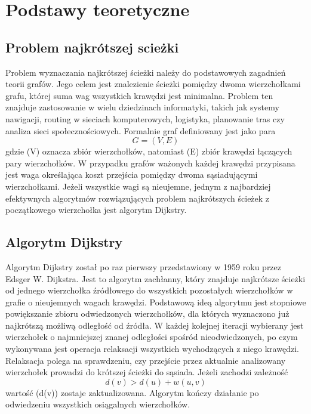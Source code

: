 \chapter{Podstawy teoretyczne}
\section{Problem najkrótszej scieżki}
\indent Problem wyznaczania najkrótszej ścieżki należy do podstawowych zagadnień teorii grafów. Jego celem jest znalezienie ścieżki pomiędzy dwoma wierzchołkami grafu, której suma wag wszystkich krawędzi jest minimalna. Problem ten znajduje zastosowanie w wielu dziedzinach informatyki, takich jak systemy nawigacji, routing w sieciach komputerowych, logistyka, planowanie tras czy analiza sieci społecznościowych.
\newline
Formalnie graf definiowany jest jako para \cite[s.~2]{diestel2017}
\begin{equation}
\label{eq:graph}
G = (V, E)
\end{equation}
gdzie (V) oznacza zbiór wierzchołków, natomiast (E) zbiór krawędzi łączących pary wierzchołków. W przypadku grafów ważonych każdej krawędzi przypisana jest waga określająca koszt przejścia pomiędzy dwoma sąsiadującymi wierzchołkami.
Jeżeli wszystkie wagi są nieujemne, jednym z najbardziej efektywnych algorytmów rozwiązujących problem najkrótszych ścieżek z początkowego wierzchołka jest algorytm Dijkstry.


\section{Algorytm Dijkstry}

Algorytm Dijkstry \cite{dijkstra} został po raz pierwszy przedstawiony w 1959 roku przez Edsger W. Dijkstra. Jest to algorytm zachłanny, który znajduje najkrótsze ścieżki od jednego wierzchołka źródłowego do wszystkich pozostałych wierzchołków w grafie o nieujemnych wagach krawędzi.
Podstawową ideą algorytmu jest stopniowe powiększanie zbioru odwiedzonych wierzchołków, dla których wyznaczono już najkrótszą możliwą odległość od źródła. W każdej kolejnej iteracji wybierany jest wierzchołek o najmniejszej znanej odległości spośród nieodwiedzonych, po czym wykonywana jest operacja relaksacji wszystkich wychodzących z niego krawędzi.
\newpage Relaksacja polega na sprawdzeniu, czy przejście przez aktualnie analizowany wierzchołek prowadzi do krótszej ścieżki do sąsiada. Jeżeli zachodzi zależność \cite[s.~649]{cormen}\begin{equation}
\label{eq:relax}
d(v) > d(u) + w(u,v)
\end{equation}
wartość (d(v)) zostaje zaktualizowana.
Algorytm kończy działanie po odwiedzeniu wszystkich osiągalnych wierzchołków.

